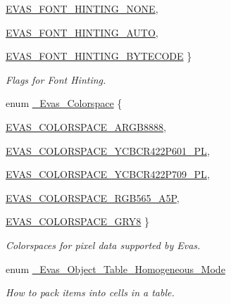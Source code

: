 \begin{DoxyCompactItemize}
\hyperlink{group__Evas__Font__Group_gga49208864211c97ac1a09f03318aa253cabe20aa1c68be79f42ccfda9bc930c338}{EVAS\_\-FONT\_\-HINTING\_\-NONE}, 
\par
\hyperlink{group__Evas__Font__Group_gga49208864211c97ac1a09f03318aa253cac056b6ea8f7ad771b406e217e34b8440}{EVAS\_\-FONT\_\-HINTING\_\-AUTO}, 
\par
\hyperlink{group__Evas__Font__Group_gga49208864211c97ac1a09f03318aa253ca4731c09040a5e13aee4242483cc5a61e}{EVAS\_\-FONT\_\-HINTING\_\-BYTECODE}
 \}
\begin{DoxyCompactList}\small\item\em Flags for Font Hinting. \item\end{DoxyCompactList}\item 
enum \hyperlink{group__Evas__Object__Image_ga84ff1db3d33d85c86d81dbe9046b54bb}{\_\-Evas\_\-Colorspace} \{ \par
\hyperlink{group__Evas__Object__Image_gga84ff1db3d33d85c86d81dbe9046b54bba0948ad4d06f0f64f757aa673d47ac254}{EVAS\_\-COLORSPACE\_\-ARGB8888}, 
\par
\hyperlink{group__Evas__Object__Image_gga84ff1db3d33d85c86d81dbe9046b54bba5e861cf48ce8169485bb334c31678636}{EVAS\_\-COLORSPACE\_\-YCBCR422P601\_\-PL}, 
\par
\hyperlink{group__Evas__Object__Image_gga84ff1db3d33d85c86d81dbe9046b54bba77eda7660a21d397912e0d6084300f22}{EVAS\_\-COLORSPACE\_\-YCBCR422P709\_\-PL}, 
\par
\hyperlink{group__Evas__Object__Image_gga84ff1db3d33d85c86d81dbe9046b54bba69c6f59ef385ef3443caa30ce009f729}{EVAS\_\-COLORSPACE\_\-RGB565\_\-A5P}, 
\par
\hyperlink{group__Evas__Object__Image_gga84ff1db3d33d85c86d81dbe9046b54bba6d0303ab6ba63b8bf89e16d39105e0f0}{EVAS\_\-COLORSPACE\_\-GRY8}
 \}
\begin{DoxyCompactList}\small\item\em Colorspaces for pixel data supported by Evas. \item\end{DoxyCompactList}\item 
enum \hyperlink{group__Evas__Object__Table_ga536e8e3c9e38ee6d82f918a341b053a8}{\_\-Evas\_\-Object\_\-Table\_\-Homogeneous\_\-Mode} 
\begin{DoxyCompactList}\small\item\em How to pack items into cells in a table. \item\end{DoxyCompactList}\item 

\end{DoxyCompactItemize}
